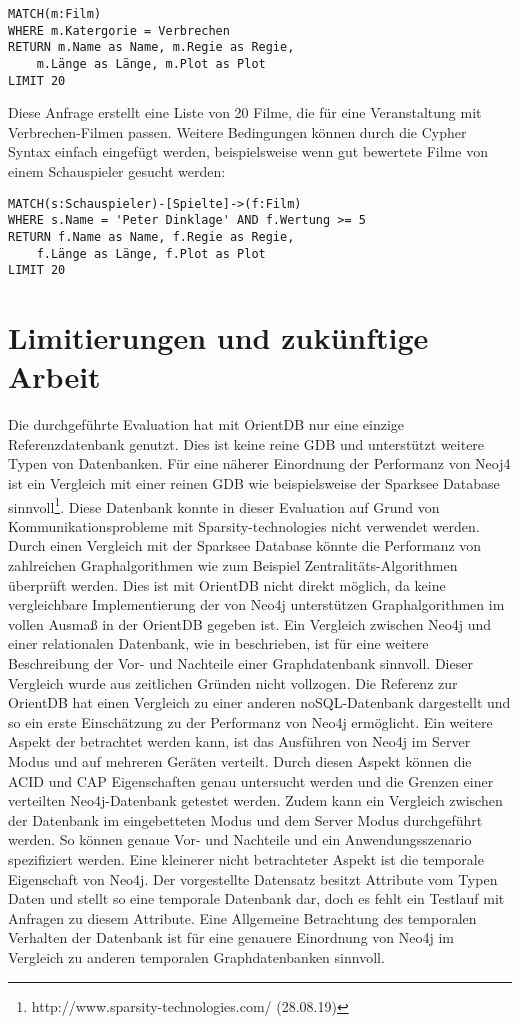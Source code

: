 \begin{Verbatim}[frame=single]
MATCH(m:Film) 
WHERE m.Katergorie = Verbrechen
RETURN m.Name as Name, m.Regie as Regie, 
	m.Länge as Länge, m.Plot as Plot 
LIMIT 20
\end{Verbatim}
Diese Anfrage erstellt eine Liste von 20 Filme, die für eine Veranstaltung mit Verbrechen-Filmen passen. Weitere Bedingungen können durch die Cypher Syntax einfach eingefügt werden, beispielsweise wenn gut bewertete Filme von einem Schauspieler gesucht werden:
\begin{Verbatim}[frame=single]
MATCH(s:Schauspieler)-[Spielte]->(f:Film) 
WHERE s.Name = 'Peter Dinklage' AND f.Wertung >= 5
RETURN f.Name as Name, f.Regie as Regie, 
	f.Länge as Länge, f.Plot as Plot 
LIMIT 20
\end{Verbatim}

\section{Limitierungen und zukünftige Arbeit}
Die durchgeführte Evaluation hat mit OrientDB nur eine einzige Referenzdatenbank genutzt. Dies ist keine reine GDB und unterstützt weitere Typen von Datenbanken. Für eine näherer Einordnung der Performanz von Neoj4 ist ein Vergleich mit einer reinen GDB wie beispielsweise der Sparksee Database sinnvoll\footnote{http://www.sparsity-technologies.com/ (28.08.19)}. Diese Datenbank konnte in dieser Evaluation auf Grund von Kommunikationsprobleme mit Sparsity-technologies nicht verwendet werden. Durch einen Vergleich mit der Sparksee Database könnte die Performanz von zahlreichen Graphalgorithmen   wie zum Beispiel Zentralitäts-Algorithmen überprüft werden. Dies ist mit OrientDB nicht direkt möglich, da keine vergleichbare Implementierung der von Neo4j unterstützen Graphalgorithmen im vollen Ausmaß in der OrientDB gegeben ist. \newline 
Ein Vergleich zwischen Neo4j und einer relationalen Datenbank, wie in \parencite{vicknair2010comparison} beschrieben, ist für eine weitere Beschreibung der Vor- und Nachteile einer Graphdatenbank sinnvoll. Dieser Vergleich wurde aus zeitlichen Gründen nicht vollzogen. Die Referenz zur OrientDB hat einen Vergleich zu einer anderen noSQL-Datenbank dargestellt und so ein erste Einschätzung zu der Performanz von Neo4j ermöglicht. \newline
Ein weitere Aspekt der betrachtet werden kann, ist das Ausführen von Neo4j im Server Modus und auf mehreren Geräten verteilt. Durch diesen Aspekt können die ACID und CAP Eigenschaften genau untersucht werden und die Grenzen einer verteilten Neo4j-Datenbank getestet werden. Zudem kann ein Vergleich zwischen der Datenbank im eingebetteten Modus und dem Server Modus durchgeführt werden. So können genaue Vor- und Nachteile und ein Anwendungsszenario spezifiziert werden. \newline
Eine kleinerer nicht betrachteter Aspekt ist die temporale Eigenschaft von Neo4j. Der vorgestellte Datensatz besitzt Attribute vom Typen Daten und stellt so eine temporale Datenbank dar, doch es fehlt ein Testlauf mit Anfragen zu diesem Attribute. Eine Allgemeine Betrachtung des temporalen Verhalten der Datenbank ist für eine genauere Einordnung von Neo4j im Vergleich zu anderen temporalen Graphdatenbanken sinnvoll. 
